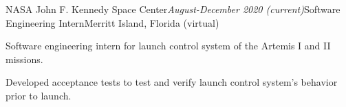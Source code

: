 \begin{rSubsection}{NASA John F. Kennedy Space Center}{\em August-December 2020 (current)}{Software Engineering Intern}{Merritt Island, Florida (virtual)}
\item Software engineering intern for launch control system of the Artemis I and II missions.
\item Developed acceptance tests to test and verify launch control system's behavior prior to launch.
\end{rSubsection}